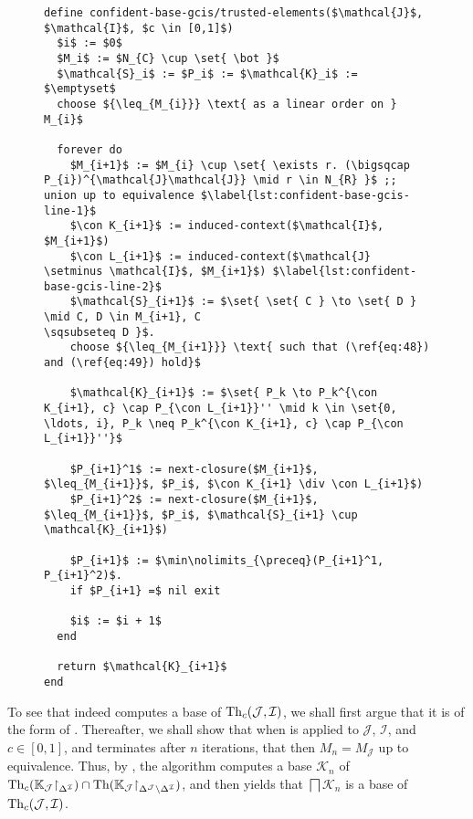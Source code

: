 
\begin{figure}[tp]
  \begin{Algorithm}
    \hspace*{0cm}
    \label{alg:confident-base-gcis/trusted-objects}
    \begin{lstlisting}
define confident-base-gcis/trusted-elements($\mathcal{J}$, $\mathcal{I}$, $c \in [0,1]$)
  $i$ := $0$
  $M_i$ := $N_{C} \cup \set{ \bot }$
  $\mathcal{S}_i$ := $P_i$ := $\mathcal{K}_i$ := $\emptyset$
  choose ${\leq_{M_{i}}} \text{ as a linear order on } M_{i}$
  
  forever do
    $M_{i+1}$ := $M_{i} \cup \set{ \exists r. (\bigsqcap P_{i})^{\mathcal{J}\mathcal{J}} \mid r \in N_{R} }$ ;; union up to equivalence $\label{lst:confident-base-gcis-line-1}$
    $\con K_{i+1}$ := induced-context($\mathcal{I}$, $M_{i+1}$)
    $\con L_{i+1}$ := induced-context($\mathcal{J} \setminus \mathcal{I}$, $M_{i+1}$) $\label{lst:confident-base-gcis-line-2}$
    $\mathcal{S}_{i+1}$ := $\set{ \set{ C } \to \set{ D } \mid C, D \in M_{i+1}, C
\sqsubseteq D }$.
    choose ${\leq_{M_{i+1}}} \text{ such that (\ref{eq:48}) and (\ref{eq:49}) hold}$

    $\mathcal{K}_{i+1}$ := $\set{ P_k \to P_k^{\con K_{i+1}, c} \cap P_{\con L_{i+1}}'' \mid k \in \set{0, \ldots, i}, P_k \neq P_k^{\con K_{i+1}, c} \cap P_{\con L_{i+1}}''}$

    $P_{i+1}^1$ := next-closure($M_{i+1}$, $\leq_{M_{i+1}}$, $P_i$, $\con K_{i+1} \div \con L_{i+1}$)
    $P_{i+1}^2$ := next-closure($M_{i+1}$, $\leq_{M_{i+1}}$, $P_i$, $\mathcal{S}_{i+1} \cup \mathcal{K}_{i+1}$)

    $P_{i+1}$ := $\min\nolimits_{\preceq}(P_{i+1}^1, P_{i+1}^2)$.
    if $P_{i+1} =$ nil exit

    $i$ := $i + 1$
  end

  return $\mathcal{K}_{i+1}$  
end
    \end{lstlisting}
  \end{Algorithm}
\end{figure}

To see that  indeed computes a base of
$\operatorname{Th}_{c}(\mathcal{J}, \mathcal{I})$, we shall first argue that it is of the form of
.  Thereafter, we shall show
that when  is applied to $\mathcal{J}$,
$\mathcal{I}$, and $c \in [0,1]$, and terminates after $n$ iterations, that then $M_{n} =
M_{\mathcal{J}}$ up to equivalence.  Thus, by
, the
algorithm computes a base $\mathcal{K}_{n}$ of $\operatorname{Th}_{c}({\mathbb{K}}_{\mathcal{J}}
\mathord{\upharpoonright}_{\Delta^{\mathcal{I}}}) \cap \operatorname{Th}({\mathbb{K}}_{\mathcal{J}}
\mathord{\upharpoonright}_{\Delta^{\mathcal{J}} \setminus \Delta^{\mathcal{I}}})$, and then
 yields that
$\bigsqcap \mathcal{K}_{n}$ is a base of $\operatorname{Th}_{c}(\mathcal{J}, \mathcal{I})$.

